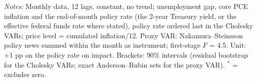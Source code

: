 \begin{table}[tp]\centering\footnotesize\setlength{\tabcolsep}{2.4pt}
\caption{Standard Methods: Responses to a 1 Percentage Point Rise in the Policy Rate}\label{tab:standard}
\begin{flushleft}\footnotesize\textit{Notes:} Monthly data, 12 lags, constant, no trend; unemployment gap, core PCE inflation and the end-of-month policy rate (the 2-year Treasury yield, or the effective federal funds rate where stated), policy rate ordered last in the Cholesky VARs; price level = cumulated inflation/12. Proxy VAR: Nakamura--Steinsson policy news summed within the month as instrument; first-stage $F$ = 4.5. Unit: +1 pp on the policy rate on impact. Brackets: 90\% intervals (residual bootstrap for the Cholesky VARs; exact Anderson--Rubin sets for the proxy VAR). $^{*}$ = excludes zero.\end{flushleft}
\end{table}
